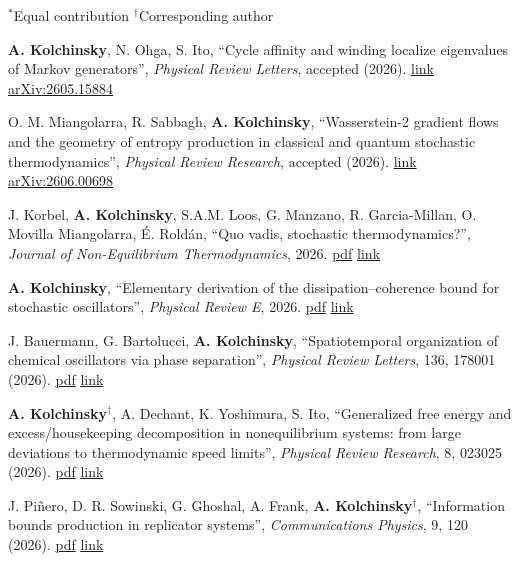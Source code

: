 
\newcommand{\pdflink}[1]{\href{https://artemyk.github.io/assets/pdf/papers/#1.pdf}{pdf}}
\newcommand{\doilink}[1]{\href{https://doi.org/#1}{link}}
\newcommand{\publink}[1]{\href{#1}{link}}
\newcommand{\CA}{$^\dagger$}

$^*$Equal contribution\hspace{25pt} \CA Corresponding author
\vspace{5pt}

\textbf{A. Kolchinsky}, N. Ohga, S. Ito, ``Cycle affinity and winding localize eigenvalues of Markov generators'', \emph{Physical Review Letters}, accepted (2026). \doilink{10.1103/dhmz-wlwh} \href{https://arxiv.org/abs/2605.15884}{arXiv:2605.15884}

O. M. Miangolarra, R. Sabbagh, \textbf{A. Kolchinsky},  ``Wasserstein-2 gradient flows and the geometry of entropy production in classical and quantum stochastic thermodynamics'', \emph{Physical Review Research}, accepted (2026). \doilink{10.1103/t5yf-qr2h} \href{https://arxiv.org/abs/2606.00698}{arXiv:2606.00698}

J. Korbel, \textbf{A. Kolchinsky}, S.A.M. Loos, G. Manzano, R. Garcia-Millan, O. Movilla Miangolarra, É. Roldán, ``Quo vadis, stochastic thermodynamics?'', \emph{Journal of Non-Equilibrium Thermodynamics}, 2026. \pdflink{KorbelEtAl-QuoVadisStochasticThermodynamics-JNET-2026} \doilink{10.1515/jnet-2026-0051}

\textbf{A. Kolchinsky}, ``Elementary derivation of the dissipation--coherence bound for stochastic oscillators'', \emph{Physical Review E}, 2026. \pdflink{Kolchinsky-ElementaryDerivationOfTheDCB-2026} \doilink{10.1103/yj2t-frgz}

J. Bauermann, G. Bartolucci, \textbf{A. Kolchinsky}, ``Spatiotemporal organization of chemical oscillators via phase separation'', \emph{Physical Review Letters}, 136, 178001 (2026). \pdflink{BauermannBartolucciKolchinsky-SpatiotemporalOrganizationsOfChemicalOscillatorsViaPhaseSeparation} \doilink{10.1103/shz6-7fj9} %

\textbf{A. Kolchinsky}\CA, A. Dechant, K. Yoshimura, S. Ito, ``Generalized free energy and excess/housekeeping decomposition in nonequilibrium systems: from large deviations to thermodynamic speed limits'', \emph{Physical Review Research}, 8, 023025 (2026). \pdflink{Kolchinsky-et-al-GeneralizedFreeEnergy-2026} \doilink{10.1103/r48t-dghl}

J. Piñero, D. R. Sowinski, G. Ghoshal, A. Frank, \textbf{A. Kolchinsky}\CA, ``Information bounds production in replicator systems'', \emph{Communications Physics}, 9, 120 (2026). \pdflink{Pinero-et-al-InformationBoundsProductionInReplicatorSystems} \doilink{10.1038/s42005-026-02527-5}

